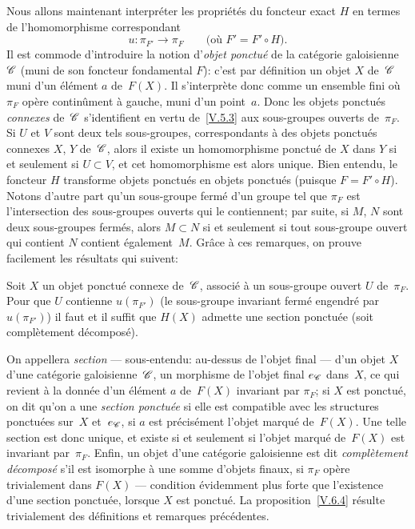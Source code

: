 Nous
allons maintenant interpr\'eter les propri\'et\'es du foncteur
exact $H$ en termes de l'homomorphisme correspondant
$$
u\colon \pi_{F'} \to \pi_{F} \qquad \text{(où $F' =F'\circ H$)}.
$$
Il est commode d'introduire la notion d'\emph{objet ponctué}
de la cat\'egorie galoisienne $\cal{C}$ (muni de son foncteur
fondamental $F$): c'est par d\'efinition un objet $X$ de~$\cal{C}$
muni d'un \'el\'ement $a$ de~$F(X)$. Il s'interpr\`ete donc
comme un ensemble fini o\`u $\pi_F$ op\`ere contin\^ument \`a
gauche, muni d'un point~$a$. Donc les objets ponctu\'es
\emph{connexes} de~$\cal{C}$ s'identifient en vertu de~\ref{V.5.3} aux
sous-groupes ouverts de~$\pi_F$. Si $U$ et $V$ sont deux tels
sous-groupes, correspondants \`a des objets ponctu\'es connexes
$X$, $Y$ de~$\cal{C}$, alors il existe un homomorphisme ponctu\'e de
$X$ dans $Y$ si et seulement si $U\subset V$, et cet homomorphisme est
alors unique. Bien entendu, le foncteur $H$ transforme objets
ponctu\'es en objets ponctu\'es (puisque $F=F' \circ H$). Notons
d'autre part qu'un sous-groupe ferm\'e d'un groupe tel que $\pi_F$
est l'intersection des sous-groupes ouverts qui le contiennent; par
suite,
si
$M$, $N$ sont deux sous-groupes ferm\'es, alors $M\subset N$ si et
seulement si tout sous-groupe ouvert qui contient $N$ contient
\'egalement~$M$. Gr\^ace \`a ces remarques, on prouve facilement
les r\'esultats qui suivent:

\begin{proposition}
\label{V.6.4}
Soit $X$ un objet ponctu\'e connexe de~$\cal{C}$, associ\'e \`a
un sous-groupe ouvert $U$ de~$\pi_F$. Pour que
$U$
contienne $u(\pi_{F'})$ (\resp le sous-groupe invariant ferm\'e
engendr\'e par~$u(\pi_{F'})$) il faut et il suffit que $H(X)$
admette une section ponctu\'ee (\resp soit compl\`etement
d\'ecompos\'e).
\end{proposition}

On appellera \emph{section} --- sous-entendu: au-dessus de l'objet
final --- d'un objet $X$ d'une cat\'egorie galoisienne~$\cal{C}$, un
morphisme de l'objet final $e_{\cal{C}}$ dans~$X$, ce qui revient
\`a la donn\'ee d'un \'el\'ement $a$ de~$F(X)$ invariant par
$\pi_F$; si $X$ est ponctu\'e, on dit qu'on a une \emph{section
ponctuée} si elle est compatible avec les structures ponctu\'ees
sur~$X$ et~$e_{\cal{C}}$, \ie si $a$ est pr\'ecis\'ement l'objet
marqu\'e de~$F(X)$. Une telle section est donc unique, et existe si
et seulement si l'objet marqu\'e de~$F(X)$ est invariant
par~$\pi_F$. Enfin, un objet d'une cat\'egorie galoisienne est dit
\emph{complètement décomposé}
s'il est isomorphe \`a une somme d'objets finaux, \ie si $\pi_F$
op\`ere trivialement dans $F(X)$ --- condition \'evidemment plus
forte que l'existence d'une section ponctu\'ee, lorsque $X$ est
ponctu\'e. La proposition~\ref{V.6.4} r\'esulte trivialement des
d\'efinitions et remarques pr\'ec\'edentes.

